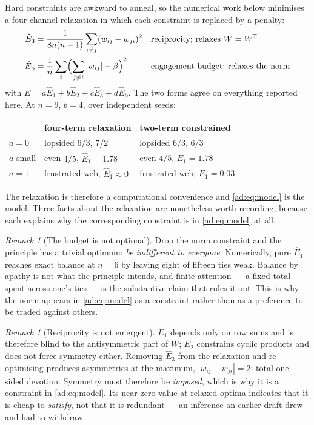 \documentclass[11pt]{article}
\numberwithin{equation}{section}
\theoremstyle{plain}
\theoremstyle{definition}
\theoremstyle{remark}
\newtheorem{remark}[theorem]{Remark}
\begin{document}
Hard constraints are awkward to anneal, so the numerical work below
minimises a four-channel relaxation in which each constraint is
replaced by a penalty:
\begin{align}
\hat E_3&=\frac{1}{8n(n-1)}\sum_{i\ne j}(w_{ij}-w_{ji})^{2}
&&\text{reciprocity; relaxes } W=W^{\!\top}\label{ad:eq:E3}\\
\hat E_{\mathrm b}&=\frac1n\sum_i\Bigl(\sum_{j\ne i}|w_{ij}|-\beta\Bigr)^{2}
&&\text{engagement budget; relaxes the norm}\label{ad:eq:Eb}
\end{align}
with $E=a\hat E_1+b\hat E_2+c\hat E_3+d\hat E_{\mathrm b}$. The two forms
agree on everything reported here. At $n=9$, $b=4$, over independent
seeds:
\begin{center}\small
\begin{tabular}{@{}lll@{}}
\toprule
& four-term relaxation & two-term constrained\\
\midrule
$a=0$ & lopsided $6/3$, $7/2$ & lopsided $6/3$, $6/3$\\
$a$ small & even $4/5$, $\hat E_1=1.78$ & even $4/5$, $E_1=1.78$\\
$a=1$ & frustrated web, $\hat E_1\approx0$ & frustrated web, $E_1=0.03$\\
\bottomrule
\end{tabular}
\end{center}
The relaxation is therefore a computational convenience and
\eqref{ad:eq:model} is the model. Three facts about the relaxation are
nonetheless worth recording, because each explains why the
corresponding constraint is in \eqref{ad:eq:model} at all.

\begin{remark}[The budget is not optional]\label{ad:rem:apathy}
Drop the norm constraint and the principle has a trivial optimum:
\emph{be indifferent to everyone}. Numerically, pure $\hat E_1$ reaches
exact balance at $n=6$ by leaving eight of fifteen ties weak. Balance by
apathy is not what the principle intends, and finite attention --- a
fixed total spent across one's ties --- is the substantive claim that
rules it out. This is why the norm appears in \eqref{ad:eq:model} as a
constraint rather than as a preference to be traded against others.
\end{remark}

\begin{remark}[Reciprocity is not emergent]\label{ad:rem:recip}
$E_1$ depends only on row sums and is therefore blind to the
antisymmetric part of $W$; $E_2$ constrains cyclic products and does not
force symmetry either. Removing $\hat E_3$ from the relaxation and
re-optimising produces asymmetries at the maximum,
$|w_{ij}-w_{ji}|=2$: total one-sided devotion. Symmetry must therefore
be \emph{imposed}, which is why it is a constraint in
\eqref{ad:eq:model}. Its near-zero value at relaxed optima indicates
that it is cheap to \emph{satisfy}, not that it is redundant --- an
inference an earlier draft drew and had to withdraw.
\end{remark}
\end{document}
